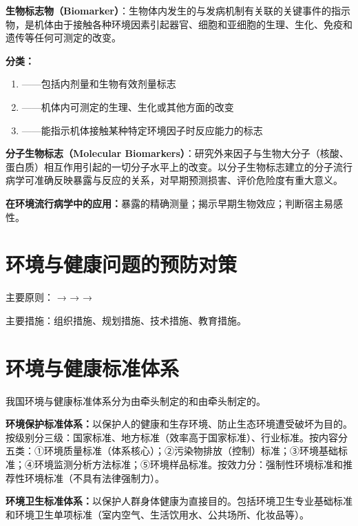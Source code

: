 \documentclass[10pt,a4paper,oneside]{ctexbook}
\begin{document}
\begin{defbox}
\textbf{生物标志物（Biomarker）}：生物体内发生的与发病机制有关联的关键事件的指示物，是机体由于接触各种环境因素引起器官、细胞和亚细胞的生理、生化、免疫和遗传等任何可测定的改变。

\textbf{分类：}
\begin{enumerate}[leftmargin=*]
    \item {}——包括内剂量和生物有效剂量标志
    \item {}——机体内可测定的生理、生化或其他方面的改变
    \item {}——能指示机体接触某种特定环境因子时反应能力的标志
\end{enumerate}

\textbf{分子生物标志（Molecular Biomarkers）}：研究外来因子与生物大分子（核酸、蛋白质）相互作用引起的一切分子水平上的改变。以分子生物标志建立的分子流行病学可准确反映暴露与反应的关系，对早期预测损害、评价危险度有重大意义。

\textbf{在环境流行病学中的应用：}暴露的精确测量；揭示早期生物效应；判断宿主易感性。
\end{defbox}

\section{环境与健康问题的预防对策}

主要原则： →  →  → 

主要措施：组织措施、规划措施、技术措施、教育措施。

\section{环境与健康标准体系}

我国环境与健康标准体系分为由牵头制定的和由牵头制定的。

\textbf{环境保护标准体系：}以保护人的健康和生存环境、防止生态环境遭受破坏为目的。按级别分三级：国家标准、地方标准（效率高于国家标准）、行业标准。按内容分五类：①环境质量标准（体系核心）；②污染物排放（控制）标准；③环境基础标准；④环境监测分析方法标准；⑤环境样品标准。按效力分：强制性环境标准和推荐性环境标准（不具有法律强制力）。

\textbf{环境卫生标准体系：}以保护人群身体健康为直接目的。包括环境卫生专业基础标准和环境卫生单项标准（室内空气、生活饮用水、公共场所、化妆品等）。
\end{document}
